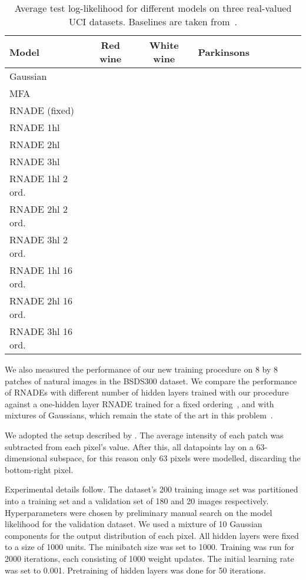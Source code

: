 \documentclass{article}
\begin{document}
\begin{table*}
\vspace*{-0.1in}
\begin{center}
\caption{Average test log-likelihood for different models on three real-valued
UCI datasets. Baselines are taken from~\cite{UriaB2013}.}
\label{tab:RNADE-UCI-results}
\medskip
\begin{tabular}{lcccccccc}
\toprule
{Model} & {Red wine} & {White wine} & {Parkinsons} \\
\midrule
{Gaussian} &  &  &  \\
{MFA} &  &  &  \\
{RNADE (fixed)} &  &  &  \\
\hline
{RNADE 1hl}
&
&
&
\\
{RNADE 2hl}
&
&
&
\\
{RNADE 3hl}
&
&
&
\\
{RNADE 1hl 2 ord.}
&
&
&
\\
{RNADE 2hl 2 ord.}
&
&
&
\\
{RNADE 3hl 2 ord.}
&
&
&
\\
{RNADE 1hl 16 ord.}
&
&
&
\\
{RNADE 2hl 16 ord.}
&
&
&
\\
{RNADE 3hl 16 ord.}
&
&
&
\\
\bottomrule
\end{tabular}
\end{center}
\end{table*}

We also measured the performance of our new training procedure on 8 by 8 patches
of natural images in the BSDS300 dataset. We compare the performance of RNADEs
with different number of hidden layers trained with our procedure against a
one-hidden layer RNADE trained for a fixed ordering~\cite{UriaB2013}, and with
mixtures of Gaussians, which remain the state of the art in this
problem~\cite{Zoran2012}.

We adopted the setup described by \citet{UriaB2013}. The average intensity of
each patch was subtracted from each pixel's value. After this, all datapoints lay
on a 63-dimensional subspace, for this reason only 63 pixels were modelled,
discarding the bottom-right pixel.

Experimental details follow. The dataset's 200 training image set was
partitioned into a training set and a validation set of 180 and 20 images
respectively. Hyperparameters were chosen by preliminary manual search on the
model likelihood for the validation dataset. We used a mixture of 10
Gaussian components for the output distribution of each pixel. All hidden layers
were fixed to a size of 1000 units. The minibatch size was set to 1000. Training was run
for 2000 iterations, each consisting of 1000 weight updates. The initial learning
rate was set to 0.001. Pretraining of hidden layers was done for 50 iterations.
\end{document}
